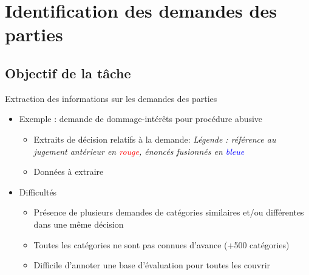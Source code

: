\section{Identification des demandes des parties}
\subsection{Objectif de la tâche}
\begin{frame}[c]{\mysubsectiontitle}
Extraction des informations sur les demandes des parties
\begin{itemize} \scriptsize 
	\item Exemple : demande de dommage-intérêts pour procédure abusive
	\begin{itemize} \scriptsize 
		\item Extraits de décision relatifs à la demande: 
	\textit{\tiny Légende : référence au jugement antérieur en \textcolor{red}{rouge}, énoncés fusionnés en \textcolor{blue}{bleue}}
    \item Données à extraire       
	\end{itemize}
\end{itemize}
 
 \vspace{-0.2cm}
 \begin{itemize} \scriptsize 
\item Difficultés
	\begin{itemize}\scriptsize 
		\item Présence de plusieurs demandes de catégories similaires et/ou différentes dans une même décision
		\item Toutes les catégories ne sont pas connues d'avance (+500 catégories)
		\item Difficile d'annoter une base d'évaluation pour toutes les couvrir
	\end{itemize}
\end{itemize}
\end{frame}

